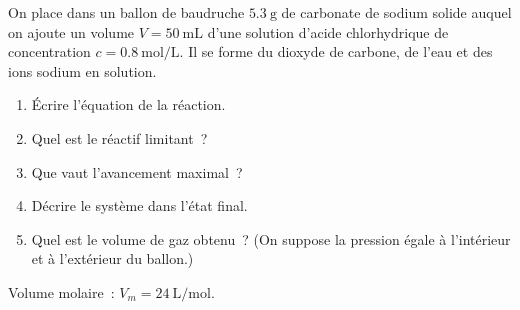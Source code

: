 On place dans un ballon de baudruche $\qty{5.3}{\g}$ de carbonate de sodium
solide  auquel on ajoute un volume $V=\qty{50}{\mL}$ d'une solution
d'acide chlorhydrique de concentration $c=\qty{0.8}{\mol\per\L}$. Il se forme du
dioxyde de carbone, de l'eau et des ions sodium en solution.
\begin{enumerate}
    \item Écrire l'équation de la réaction.
    \item Quel est le réactif limitant~?
    \item Que vaut l'avancement maximal~?
    \item Décrire le système dans l'état final.
    \item Quel est le volume de gaz obtenu~? (On suppose la pression égale à
          l'intérieur et à l'extérieur du ballon.)
\end{enumerate}
\begin{donnees}
    Volume molaire~: $V_{m}=\qty{24}{\L\per\mol}$.
\end{donnees}

